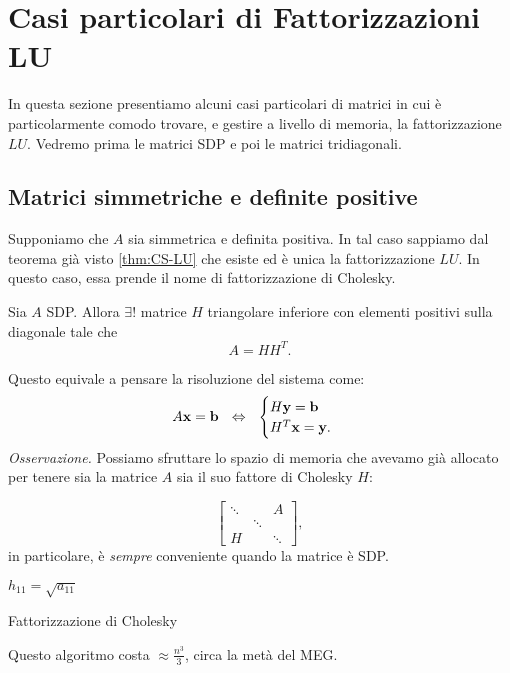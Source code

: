 \section{Casi particolari di Fattorizzazioni LU}
In questa sezione presentiamo alcuni casi particolari di matrici in cui è particolarmente comodo trovare, e gestire a livello di memoria, la fattorizzazione $LU$.
Vedremo prima le matrici SDP e poi le matrici tridiagonali.

\subsection{Matrici simmetriche e definite positive}

Supponiamo che $\displaystyle A$ sia simmetrica e definita positiva.
In tal caso sappiamo dal teorema già visto \ref{thm:CS-LU} che esiste ed è unica la fattorizzazione $LU$.
In questo caso, essa prende il nome di fattorizzazione di Cholesky.
\begin{theorem}
Sia $\displaystyle A$ SDP. Allora $\displaystyle \exists !$ matrice $\displaystyle H$ triangolare inferiore con elementi positivi sulla diagonale tale che
\begin{equation*}
A=HH^{T}.
\end{equation*}
\end{theorem}
Questo equivale a pensare la risoluzione del sistema come:
\begin{equation*}
A\x =\mathbf{b} \ \ \Leftrightarrow \ \ \begin{cases}
H\y =\mathbf{b}\\
H^{T}\x =\y.
\end{cases}
\end{equation*}
\textit{Osservazione.} Possiamo sfruttare lo spazio di memoria che avevamo già allocato per tenere sia la matrice $\displaystyle A$ sia il suo fattore di Cholesky $\displaystyle H$:

\begin{equation*}
\begin{bmatrix}
\ddots  &  & A\\
 & \ddots  & \\
H &  & \ddots
\end{bmatrix},
\end{equation*}
in particolare, è \textit{sempre} conveniente quando la matrice è SDP.

\begin{algo}
    $h_{11} =\sqrt{a_{11}}$\;
    \caption{Fattorizzazione di Cholesky}
\end{algo}
Questo algoritmo costa $\displaystyle \approx \frac{n^{3}}{3}$, circa la metà del MEG.

